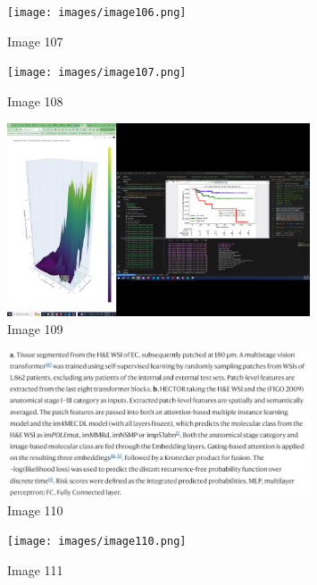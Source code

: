 \documentclass{article}%
\begin{document}
%


\begin{figure}[h!]%
\centering%
\texttt{[image: images/image106.png]}%
\caption{Image 107}%
\end{figure}

%


\begin{figure}[h!]%
\centering%
\texttt{[image: images/image107.png]}%
\caption{Image 108}%
\end{figure}

%


\begin{figure}[h!]%
\centering%
\includegraphics[width=0.8\textwidth]{images/image108.png}%
\caption{Image 109}%
\end{figure}

%


\begin{figure}[h!]%
\centering%
\includegraphics[width=0.8\textwidth]{images/image109.png}%
\caption{Image 110}%
\end{figure}

%


\begin{figure}[h!]%
\centering%
\texttt{[image: images/image110.png]}%
\caption{Image 111}%
\end{figure}

%
\end{document}
